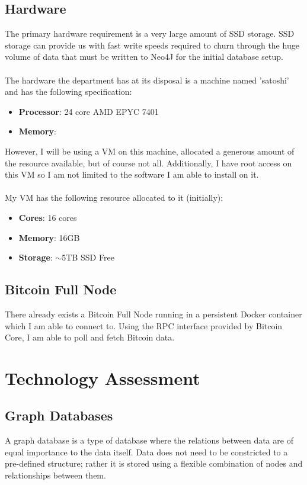 \subsection{Hardware}
The primary hardware requirement is a very large amount of SSD storage. SSD storage can provide us with fast write speeds required to churn through the huge volume of data that must be written to Neo4J for the initial database setup.
\\\\
The hardware the department has at its disposal is a machine named 'satoshi' and has the following specification:
\begin{itemize}
    \item \textbf{Processor}: 24 core AMD EPYC 7401 
    \item \textbf{Memory}: 
\end{itemize}
However, I will be using a VM on this machine, allocated a generous amount of the resource available, but of course not all. Additionally, I have root access on this VM so I am not limited to the software I am able to install on it. 
\\\\
My VM has the following resource allocated to it (initially):
\begin{itemize}
    \item \textbf{Cores}: 16 cores 
    \item \textbf{Memory}: 16GB
    \item \textbf{Storage}: $\sim$5TB SSD Free
\end{itemize}

\subsection{Bitcoin Full Node}
There already exists a Bitcoin Full Node running in a persistent Docker container which I am able to connect to. Using the RPC interface provided by Bitcoin Core, I am able to poll and fetch Bitcoin data. 

\section{Technology Assessment}


\subsection{Graph Databases}
A graph database is a type of database where the relations between data are of equal importance to the data itself. Data does not need to be constricted to a pre-defined structure; rather it is stored using a flexible combination of nodes and relationships between them. 

